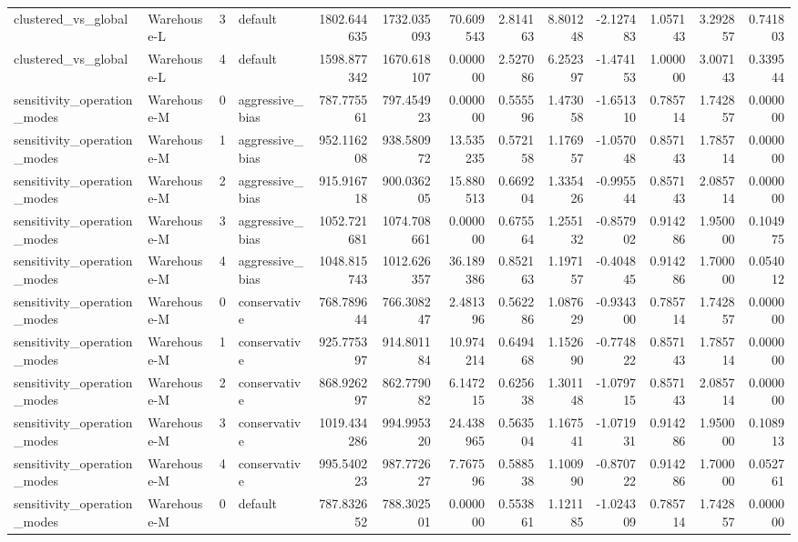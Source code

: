 \begin{tabular}{llrlrrrrrrrrr}
clustered\_vs\_global & Warehouse-L & 3 & default & 1802.644635 & 1732.035093 & 70.609543 & 2.814163 & 8.801248 & -2.127483 & 1.057143 & 3.292857 & 0.741803 \\
clustered\_vs\_global & Warehouse-L & 4 & default & 1598.877342 & 1670.618107 & 0.000000 & 2.527086 & 6.252397 & -1.474153 & 1.000000 & 3.007143 & 0.339544 \\
sensitivity\_operation\_modes & Warehouse-M & 0 & aggressive\_bias & 787.775561 & 797.454923 & 0.000000 & 0.555596 & 1.473058 & -1.651310 & 0.785714 & 1.742857 & 0.000000 \\
sensitivity\_operation\_modes & Warehouse-M & 1 & aggressive\_bias & 952.116208 & 938.580972 & 13.535235 & 0.572158 & 1.176957 & -1.057048 & 0.857143 & 1.785714 & 0.000000 \\
sensitivity\_operation\_modes & Warehouse-M & 2 & aggressive\_bias & 915.916718 & 900.036205 & 15.880513 & 0.669204 & 1.335426 & -0.995544 & 0.857143 & 2.085714 & 0.000000 \\
sensitivity\_operation\_modes & Warehouse-M & 3 & aggressive\_bias & 1052.721681 & 1074.708661 & 0.000000 & 0.675564 & 1.255132 & -0.857902 & 0.914286 & 1.950000 & 0.104975 \\
sensitivity\_operation\_modes & Warehouse-M & 4 & aggressive\_bias & 1048.815743 & 1012.626357 & 36.189386 & 0.852163 & 1.197157 & -0.404845 & 0.914286 & 1.700000 & 0.054012 \\
sensitivity\_operation\_modes & Warehouse-M & 0 & conservative & 768.789644 & 766.308247 & 2.481396 & 0.562286 & 1.087629 & -0.934300 & 0.785714 & 1.742857 & 0.000000 \\
sensitivity\_operation\_modes & Warehouse-M & 1 & conservative & 925.775397 & 914.801184 & 10.974214 & 0.649468 & 1.152690 & -0.774822 & 0.857143 & 1.785714 & 0.000000 \\
sensitivity\_operation\_modes & Warehouse-M & 2 & conservative & 868.926297 & 862.779082 & 6.147215 & 0.625638 & 1.301148 & -1.079715 & 0.857143 & 2.085714 & 0.000000 \\
sensitivity\_operation\_modes & Warehouse-M & 3 & conservative & 1019.434286 & 994.995320 & 24.438965 & 0.563504 & 1.167541 & -1.071931 & 0.914286 & 1.950000 & 0.108913 \\
sensitivity\_operation\_modes & Warehouse-M & 4 & conservative & 995.540223 & 987.772627 & 7.767596 & 0.588538 & 1.100990 & -0.870722 & 0.914286 & 1.700000 & 0.052761 \\
sensitivity\_operation\_modes & Warehouse-M & 0 & default & 787.832652 & 788.302501 & 0.000000 & 0.553861 & 1.121185 & -1.024309 & 0.785714 & 1.742857 & 0.000000 \\

\end{tabular}
